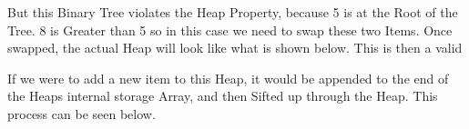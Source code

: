 \begin{flushleft}
                But this Binary Tree violates the Heap Property, because 5 is at the Root of the Tree. 8 is Greater than 5
                so in this case we need to swap these two Items. Once swapped, the actual Heap will look like what is shown below.
                This is then a valid

                \begin{figure}[H]
                    \centering
                    \subfloat
                    {
                    }
                \end{figure}

                If we were to add a new item to this Heap, it would be appended to the end of the Heaps internal 
                storage Array, and then Sifted up through the Heap. This process can be seen below.


\end{flushleft}
